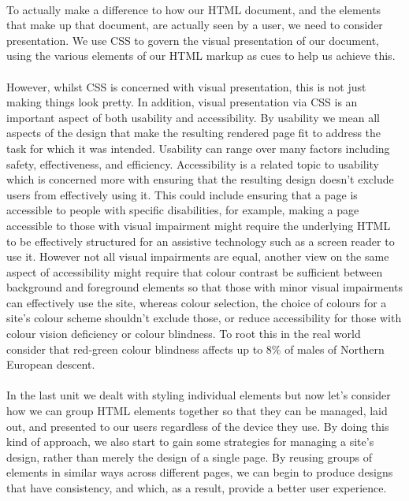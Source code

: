 \paragraph{} To actually make a difference to how our HTML document, and the elements that make up that document, are actually seen by a user, we need to consider presentation. We use CSS to govern the visual presentation of our document, using the various elements of our HTML markup as cues to help us achieve this. 
\paragraph{} However, whilst CSS is concerned with visual presentation, this is not just making things look pretty. In addition, visual presentation via CSS is an important aspect of both usability and accessibility. By usability we mean all aspects of the design that make the resulting rendered page fit to address the task for which it was intended. Usability can range over many factors including safety, effectiveness, and efficiency. Accessibility is a related topic to usability which is concerned more with ensuring that the resulting design doesn't exclude users from effectively using it. This could include ensuring that a page is accessible to people with specific disabilities, for example, making a page accessible to those with visual impairment might require the underlying HTML to be effectively structured for an assistive technology such as a screen reader to use it. However not all visual impairments are equal, another view on the same aspect of accessibility might require that colour contrast be sufficient between background and foreground elements so that those with minor visual impairments can effectively use the site, whereas colour selection, the choice of colours for a site's colour scheme shouldn't exclude those, or reduce accessibility for those with colour vision deficiency or colour blindness. To root this in the real world consider that red-green colour blindness affects up to 8\% of males of Northern European descent.
\paragraph{} In the last unit we dealt with styling individual elements but now let's consider how we can group HTML elements together so that they can be managed, laid out, and presented to our users regardless of the device they use. By doing this kind of approach, we also start to gain some strategies for managing a site's design, rather than merely the design of a single page. By reusing groups of elements in similar ways across different pages, we can begin to produce designs that have consistency, and which, as a result, provide a better user experience.
